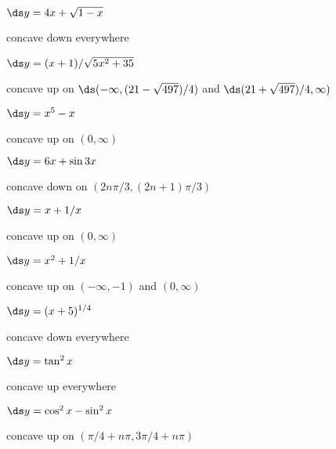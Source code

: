 \begin{enumialphparenastyle}
\begin{ex}
 $\ds y = 4x+\sqrt{1-x}$
\begin{sol}
 concave down everywhere
\end{sol}
\end{ex}

\begin{ex}
 $\ds y = (x+1)/\sqrt{5x^2 + 35}$
\begin{sol}
 concave up on $\ds (-\infty,(21-\sqrt{497})/4)$ and 
$\ds (21+\sqrt{497})/4,\infty)$
\end{sol}
\end{ex}

\begin{ex}
 $\ds y= x^5 - x$
\begin{sol}
 concave up on $(0,\infty)$
\end{sol}
\end{ex}

\begin{ex}
 $\ds y = 6x + \sin 3x$
\begin{sol}
 concave down on $(2n\pi/3,(2n+1)\pi/3)$
\end{sol}
\end{ex}

\begin{ex}
 $\ds y = x+ 1/x$
\begin{sol}
 concave up on $(0,\infty)$
\end{sol}
\end{ex}

\begin{ex}
 $\ds y = x^2+ 1/x$
\begin{sol}
 concave up on $(-\infty,-1)$ and $(0,\infty)$
\end{sol}
\end{ex}

\begin{ex}
 $\ds y = (x+5)^{1/4}$
\begin{sol}
 concave down everywhere
\end{sol}
\end{ex}

\begin{ex}
 $\ds y = \tan^2 x$
\begin{sol}
 concave up everywhere
\end{sol}
\end{ex}

\begin{ex}
 $\ds y =\cos^2 x - \sin^2 x$
\begin{sol}
 concave up on $(\pi/4+n\pi,3\pi/4+n\pi)$
\end{sol}
\end{ex}


\end{enumialphparenastyle}
